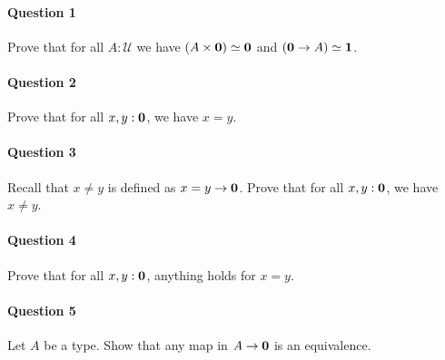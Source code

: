 \documentclass{article}[6pt]%
\newcommand{\U}{{\mathcal U}}
\renewcommand{\r}{\rightarrow}
\newcommand{\one}{{\bf 1}}
\newcommand{\zero}{{\bf 0}}
\begin{document}
\begin{Exercise}[title={The empty type}]

\paragraph{Question 1} Prove that for all $A:\U$ we have $(A\times \zero) \simeq \zero$ and $(\zero\r A)\simeq \one$.

\paragraph{Question 2} Prove that for all $x,y:\zero$, we have $x=y$.


\paragraph{Question 3} Recall that $x\neq y$ is defined as $x=y\r \zero$. Prove that for all $x,y:\zero$, we have $x\neq y$.

\paragraph{Question 4} Prove that for all $x,y:\zero$, anything holds for $x=y$.

\paragraph{Question 5} Let $A$ be a type. Show that any map in $A\r \zero$ is an equivalence.


\end{Exercise}
\end{document}
